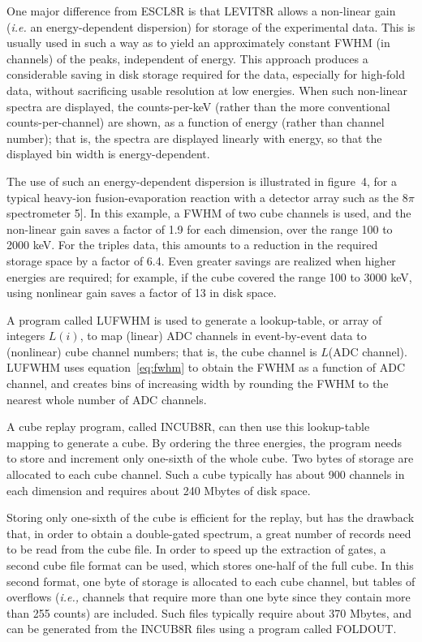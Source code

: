 One major difference from ESCL8R is that LEVIT8R allows a non-linear gain
({\em i.e.} an energy-dependent dispersion) for storage of the experimental
data. This is usually used in such a way as to yield an approximately constant
FWHM (in channels) of the peaks, independent of energy. This approach produces
a considerable saving in disk storage required for the data, especially for
high-fold data, without sacrificing usable resolution at low energies. When
such non-linear spectra are displayed, the counts-per-keV (rather than the more
conventional counts-per-channel) are shown, as a function of energy (rather
than channel number); that is, the spectra are displayed linearly with energy,
so that the displayed bin width is energy-dependent.

The use of such an energy-dependent dispersion is illustrated in figure~4, for
a typical heavy-ion fusion-evaporation reaction with a detector array such as
the $8\pi$ spectrometer 5]. In this example, a FWHM of two cube channels is
used, and the non-linear gain saves a factor of 1.9 for each dimension, over
the range 100 to 2000 keV. For the triples data, this amounts to a reduction in
the required storage space by a factor of 6.4. Even greater savings are
realized when higher energies are required; for example, if the cube covered
the range 100 to 3000 keV, using nonlinear gain saves a factor of 13 in disk
space.

A program called LUFWHM is used to generate a lookup-table, or array of
integers $L(i)$, to map (linear) ADC channels in event-by-event data to
(nonlinear) cube channel numbers; that is, the cube channel is $L$(ADC
channel). LUFWHM uses equation~\ref{eq:fwhm} to obtain the FWHM as a function
of ADC channel, and creates bins of increasing width by rounding the FWHM to
the nearest whole number of ADC channels.

A cube replay program, called INCUB8R, can then use this lookup-table mapping
to generate a cube. By ordering the three energies, the program needs to store
and increment only one-sixth of the whole cube. Two bytes of storage are
allocated to each cube channel. Such a cube typically has about 900 channels in
each dimension and requires about 240 Mbytes of disk space.

Storing only one-sixth of the cube is efficient for the replay, but has the
drawback that, in order to obtain a double-gated spectrum, a great number of
records need to be read from the cube file. In order to speed up the extraction
of gates, a second cube file format can be used, which stores one-half of the
full cube. In this second format, one byte of storage is allocated to each cube
channel, but tables of overflows ({\em i.e.,} channels that require more than
one byte since they contain more than 255 counts) are included. Such files
typically require about 370 Mbytes, and can be generated from the INCUB8R files
using a program called FOLDOUT.


